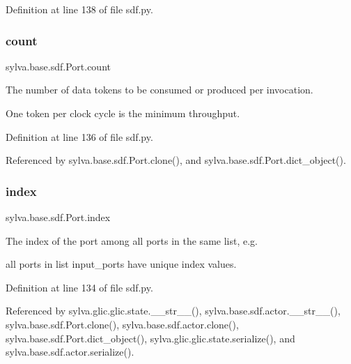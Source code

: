 Definition at line 138 of file sdf.\+py.

\mbox{\label{classsylva_1_1base_1_1sdf_1_1_port_aec009757acfd92df95b273c671cac068}} 
\subsubsection{\texorpdfstring{count}{count}}
{\footnotesize\ttfamily sylva.\+base.\+sdf.\+Port.\+count}



The number of data tokens to be consumed or produced per invocation. 

One token per clock cycle is the minimum throughput. 

Definition at line 136 of file sdf.\+py.



Referenced by sylva.\+base.\+sdf.\+Port.\+clone(), and sylva.\+base.\+sdf.\+Port.\+dict\+\_\+object().

\mbox{\label{classsylva_1_1base_1_1sdf_1_1_port_abbfd66f762649b6a8105657259471c5a}} 
\subsubsection{\texorpdfstring{index}{index}}
{\footnotesize\ttfamily sylva.\+base.\+sdf.\+Port.\+index}



The index of the port among all ports in the same list, e.\+g. 

all ports in list {\ttfamily input\+\_\+ports} have unique index values. 

Definition at line 134 of file sdf.\+py.



Referenced by sylva.\+glic.\+glic.\+state.\+\_\+\+\_\+str\+\_\+\+\_\+(), sylva.\+base.\+sdf.\+actor.\+\_\+\+\_\+str\+\_\+\+\_\+(), sylva.\+base.\+sdf.\+Port.\+clone(), sylva.\+base.\+sdf.\+actor.\+clone(), sylva.\+base.\+sdf.\+Port.\+dict\+\_\+object(), sylva.\+glic.\+glic.\+state.\+serialize(), and sylva.\+base.\+sdf.\+actor.\+serialize().

